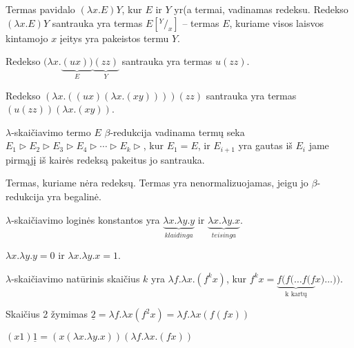 \begin{defn}
  Termas pavidalo $(\lambda x.E)Y$, kur $E$ ir $Y$ yr(a termai, vadinamas
  redeksu. Redekso $(\lambda x.E)Y$ santrauka yra termas $E[^Y/_x]$
  – termas $E$, kuriame visos laisvos kintamojo $x$ įeitys yra pakeistos
  termu $Y$.
  \begin{exmp}
    Redekso $(\lambda x.\underbrace{(ux))}_{E}\underbrace{(zz)}_{Y}$
    santrauka yra termas $u(zz)$.
  \end{exmp}
  \begin{exmp}
    Redekso $(\lambda x.((ux)(\lambda x.(xy))))(zz)$ santrauka yra 
    termas $(u(zz))(\lambda x.(xy))$.
  \end{exmp}
\end{defn}

\begin{defn}
  $\lambda$-skaičiavimo termo $E$ $\beta$-redukcija vadinama termų seka
  $E_1 \triangleright E_2 \triangleright E_3 \triangleright %
  E_4 \triangleright \cdots \triangleright E_k \triangleright$, kur
  $E_1 = E$, ir $E_{i+1}$ yra gautas iš $E_{i}$ jame pirmąjį iš kairės 
  redeksą pakeitus jo santrauka.
\end{defn}

\begin{defn}
  Termas, kuriame nėra redeksų. Termas yra nenormalizuojamas, jeigu jo 
  $\beta$-redukcija yra begalinė.
\end{defn}

\begin{defn}
  $\lambda$-skaičiavimo loginės konstantos yra 
  $\underbrace{\lambda x.\lambda y.y}_{klaidinga}$ ir 
  $\underbrace{\lambda x.\lambda y.x}_{teisinga}$.
  \begin{notation}
    $\lambda x.\lambda y.y = 0$ ir $\lambda x.\lambda y.x = 1$.
  \end{notation}
\end{defn}

\begin{defn}
  $\lambda$-skaičiavimo natūrinis skaičius $k$ yra 
  $\lambda f.\lambda x.(f^{k} x)$, kur
  $f^{k} x = \underbrace{f(f(\dots f(f}_{\text{k kartų}} x )\dots))$.
  \begin{notation}
    Skaičius 2 žymimas 
    $\underline{2} = \lambda f.\lambda x(f^{2} x) =%
    \lambda f.\lambda x(f(fx))$
  \end{notation}
\end{defn}

\begin{exmp}
  $(x1)\underline{1} = (x(\lambda x.\lambda y.x))(\lambda f.\lambda x.(fx))$
\end{exmp}

